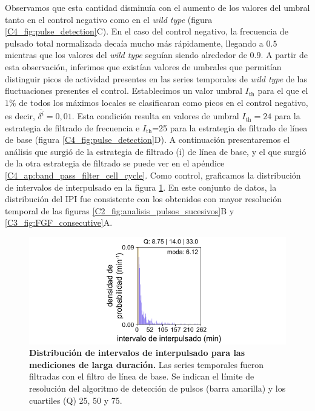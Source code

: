\documentclass[./main.tex]{subfiles}
\begin{document}
Observamos que esta cantidad disminuía con el aumento de los valores del umbral tanto en el control negativo como en el \textit{wild type} (figura \ref{C4_fig:pulse_detection}C). En el caso del control negativo, la frecuencia de pulsado total normalizada decaía mucho más rápidamente, llegando a $0.5$ mientras que los valores del \textit{wild type} seguían siendo alrededor de $0.9$. A partir de esta observación, inferimos que existían valores de umbrales que permitían distinguir picos de actividad presentes en las series temporales de \textit{wild type} de las fluctuaciones presentes el control. Establecimos un valor umbral $I_{\text{th}}$ para el que el $1 \%$ de todos los máximos locales se clasificaran como picos en el control negativo, es decir, $\overline{\delta^i}=0,01$. Esta condición resulta en valores de umbral $I_{\text{th}}=24$ para la estrategia de filtrado de frecuencia e $I_{\text{th}}$=25 para la estrategia de filtrado de línea de base (figura \ref{C4_fig:pulse_detection}D). A continuación presentaremos el análisis que surgió de la estrategia de filtrado (i) de línea de base, y el que surgió de la otra estrategia de filtrado se puede ver en el apéndice \ref{C4_ap:band_pass_filter_cell_cycle}. Como control, graficamos la distribución de intervalos de interpulsado en la figura \ref{C4_fig:IPI}. En este conjunto de datos, la distribución del IPI fue consistente con los obtenidos con mayor resolución temporal de las figuras \ref{C2_fig:analisis_pulsos_sucesivos}B y \ref{C3_fig:FGF_consecutive}A. 

\begin{figure}
    \centering
    \includegraphics[width=1\columnwidth]{figures/chapter4/C4_IPI.pdf}
    \caption{\textbf{Distribución de intervalos de interpulsado para las mediciones de larga duración.} Las series temporales fueron filtradas con el filtro de línea de base. Se indican el límite de resolución del algoritmo de detección de pulsos (barra amarilla) y los cuartiles (Q) 25, 50 y 75.}
    \label{C4_fig:IPI}
\end{figure}
\end{document}
